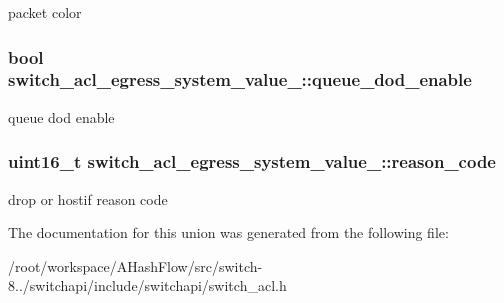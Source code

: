 packet color \hypertarget{unionswitch__acl__egress__system__value___a27c7f2109af67ac3f4f7f565c88b5db9}{
\subsubsection[{queue\+\_\+dod\+\_\+enable}]{\setlength{\rightskip}{0pt plus 5cm}bool switch\+\_\+acl\+\_\+egress\+\_\+system\+\_\+value\+\_\+\+::queue\+\_\+dod\+\_\+enable}}\label{unionswitch__acl__egress__system__value___a27c7f2109af67ac3f4f7f565c88b5db9}
queue dod enable \hypertarget{unionswitch__acl__egress__system__value___ab415ce1fcc2667a77d533688f0a78368}{
\subsubsection[{reason\+\_\+code}]{\setlength{\rightskip}{0pt plus 5cm}uint16\+\_\+t switch\+\_\+acl\+\_\+egress\+\_\+system\+\_\+value\+\_\+\+::reason\+\_\+code}}\label{unionswitch__acl__egress__system__value___ab415ce1fcc2667a77d533688f0a78368}
drop or hostif reason code 

The documentation for this union was generated from the following file\+:\begin{DoxyCompactItemize}
\item 
/root/workspace/\+A\+Hash\+Flow/src/switch-\/8../switchapi/include/switchapi/switch\+\_\+acl.\+h\end{DoxyCompactItemize}
